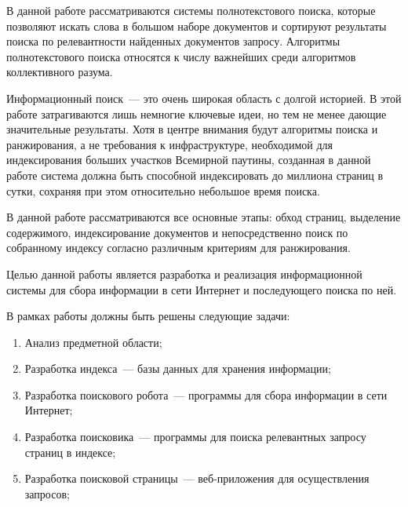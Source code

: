 \Introduction

В данной работе рассматриваются системы полнотекстового поиска, которые позволяют искать слова в большом наборе документов и сортируют результаты поиска по релевантности найденных документов запросу. Алгоритмы полнотекстового поиска относятся к числу важнейших среди алгоритмов коллективного разума.

Информационный поиск~--- это очень широкая область с долгой историей. В этой работе затрагиваются лишь немногие ключевые идеи, но тем не менее дающие значительные результаты. Хотя в центре внимания будут алгоритмы поиска и ранжирования, а не требования к инфраструктуре, необходимой для индексирования больших участков Всемирной паутины, созданная в данной работе система должна быть способной индексировать до миллиона страниц в сутки, сохраняя при этом относительно небольшое время поиска.

В данной работе рассматриваются все основные этапы: обход страниц, выделение содержимого, индексирование документов и непосредственно поиск по собранному индексу согласно различным критериям для ранжирования.

Целью данной работы является разработка и реализация информационной системы для сбора информации в сети Интернет и последующего поиска по ней.

В рамках работы должны быть решены следующие задачи:
\begin{enumerate}
  \item Анализ предметной области;
  \item Разработка индекса~--- базы данных для хранения информации;
  \item Разработка поискового робота~--- программы для сбора информации в сети Интернет;
  \item Разработка поисковика~--- программы для поиска релевантных запросу страниц в индексе;
  \item Разработка поисковой страницы~--- веб-приложения для осуществления запросов;
\end{enumerate}

